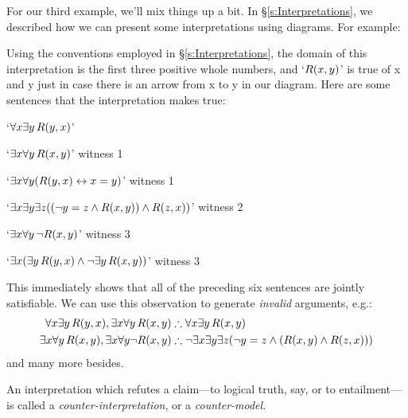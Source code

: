 For our third example, we'll mix things up a bit. In \S\ref{s:Interpretations}, we described how we can present some interpretations using diagrams. For example:
\begin{center}
\end{center}
Using the conventions employed in \S\ref{s:Interpretations}, the domain of this interpretation is the first three positive whole numbers, and `$\mathord{R}(x,y)$' is true of x and y just in case there is an arrow from x to y in our diagram. Here are some sentences that the interpretation makes true:
\begin{ebullet}
	\item `$\forall x \exists y\, \mathord{R}(y,x)$' 
	\item `$\exists x \forall y\, \mathord{R}(x,y)$' \hfill witness 1
	\item `$\exists x \forall y (\mathord{R}(y,x) \leftrightarrow x = y)$' \hfill witness 1
	\item `$\exists x \exists y \exists z ((\neg y = z \wedge \mathord{R}(x,y)) \wedge \mathord{R}(z,x))$' \hfill witness 2
	\item `$\exists x \forall y\, \neg \mathord{R}(x,y)$' \hfill witness 3
	\item `$\exists x (\exists y\, \mathord{R}(y,x) \wedge \neg \exists y\, \mathord{R}(x,y))$' \hfill witness 3
\end{ebullet}
This immediately shows that all of the preceding six sentences are jointly satisfiable. We can use this observation to generate \emph{invalid} arguments, e.g.:
\begin{align*}
	\forall x \exists y\, \atom{R}{y,x}, \exists x \forall y\, \atom{R}{x,y}  &\therefore  \forall x \exists y\, \atom{R}{x,y}\\
	\exists x \forall y\, \atom{R}{x,y}, \exists x \forall y \enot \atom{R}{x,y} & \therefore \enot \exists x \exists y \exists z (\enot y = z \eand (\atom{R}{x,y} \eand \atom{R}{z,x}))
\end{align*}
and many more besides.

An interpretation which refutes a claim---to logical truth, say, or to entailment---is called a \emph{counter-interpretation}, or a \emph{counter-model}. 


